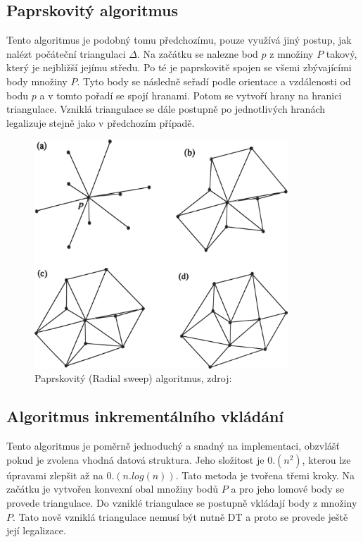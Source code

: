 \documentclass[12pt,a4paper]{article}
\begin{document}
\newpage
\subsection{Paprskovitý algoritmus}

Tento algoritmus je podobný tomu předchozímu, pouze využívá jiný postup, jak nalézt počáteční triangulaci $\Delta$. Na začátku se nalezne bod $p$ z množiny $P$ takový, který je nejbližší jejímu středu. Po té je paprskovitě spojen se všemi zbývajícími body množiny $P$. Tyto body se následně seřadí podle orientace a vzdálenosti od bodu $p$ a v tomto pořadí se spojí hranami. Potom se vytvoří hrany na hranici triangulace. Vzniklá triangulace se dále postupně po jednotlivých hranách legalizuje stejně jako v předchozím případě.

\begin{figure}[h!]
\centering
\includegraphics[width=0.85\textwidth]{img/rsweep.png}
\caption{Paprskovitý (Radial sweep) algoritmus, zdroj: \cite{triangulation}}
\label{fig:rsweep}
\end{figure}

\newpage
\subsection{Algoritmus inkrementálního vkládání}
\label{subsec:Inc_alg}

Tento algoritmus je poměrně jednoduchý a snadný na implementaci, obzvlášť pokud je zvolena vhodná datová struktura. Jeho složitost je $0.(n^2)$, kterou lze úpravami zlepšit až na $0.(n.log(n))$. Tato metoda je tvořena třemi kroky. Na začátku je vytvořen konvexní obal množiny bodů $P$ a pro jeho lomové body se provede triangulace. Do vzniklé triangulace se postupně vkládají body z množiny $P$. Tato nově vzniklá triangulace nemusí být nutně DT a proto se provede ještě její legalizace.
\end{document}
